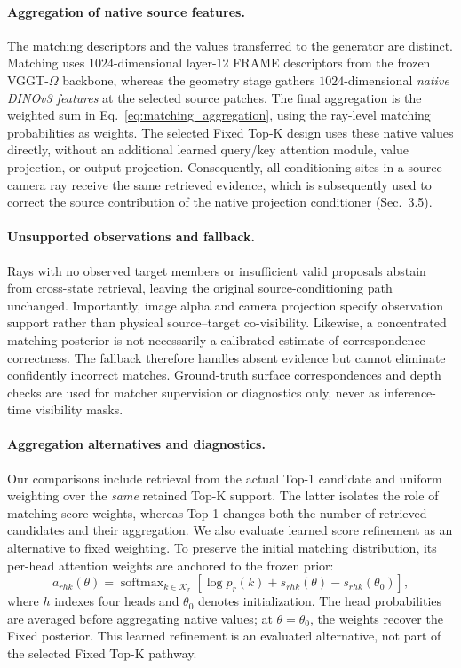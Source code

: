 \begin{appendix}
\paragraph{Aggregation of native source features.}
The matching descriptors and the values transferred to the generator are distinct.
Matching uses $1024$-dimensional layer-12 FRAME descriptors from the frozen VGGT-$\Omega$ backbone, whereas the geometry stage gathers $1024$-dimensional \emph{native DINOv3 features} at the selected source patches.
The final aggregation is the weighted sum in Eq.~\eqref{eq:matching_aggregation}, using the ray-level matching probabilities as weights.
The selected Fixed Top-K design uses these native values directly, without an additional learned query/key attention module, value projection, or output projection.
Consequently, all conditioning sites in a source-camera ray receive the same retrieved evidence, which is subsequently used to correct the source contribution of the native projection conditioner (Sec.~3.5).

\paragraph{Unsupported observations and fallback.}
Rays with no observed target members or insufficient valid proposals abstain from cross-state retrieval, leaving the original source-conditioning path unchanged.
Importantly, image alpha and camera projection specify observation support rather than physical source--target co-visibility.
Likewise, a concentrated matching posterior is not necessarily a calibrated estimate of correspondence correctness.
The fallback therefore handles absent evidence but cannot eliminate confidently incorrect matches.
Ground-truth surface correspondences and depth checks are used for matcher supervision or diagnostics only, never as inference-time visibility masks.

\paragraph{Aggregation alternatives and diagnostics.}
Our comparisons include retrieval from the actual Top-1 candidate and uniform weighting over the \emph{same} retained Top-K support.
The latter isolates the role of matching-score weights, whereas Top-1 changes both the number of retrieved candidates and their aggregation.
We also evaluate learned score refinement as an alternative to fixed weighting.
To preserve the initial matching distribution, its per-head attention weights are anchored to the frozen prior:
\begin{equation}
    a_{rhk}(\theta)=
    \operatorname{softmax}_{k\in\mathcal{K}_r}
    \left[\log p_r(k)+s_{rhk}(\theta)-s_{rhk}(\theta_0)\right],
    \label{eq:supp_anchored_matching_attention}
\end{equation}
where $h$ indexes four heads and $\theta_0$ denotes initialization.
The head probabilities are averaged before aggregating native values; at $\theta=\theta_0$, the weights recover the Fixed posterior.
This learned refinement is an evaluated alternative, not part of the selected Fixed Top-K pathway.


\end{appendix}
